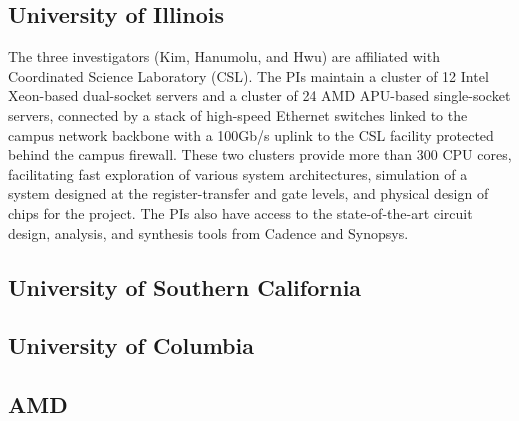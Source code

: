\subsection{University of Illinois}
The three investigators (Kim, Hanumolu, and Hwu) are affiliated with Coordinated Science Laboratory (CSL). 
The PIs maintain a cluster of 12 Intel Xeon-based dual-socket servers and a cluster of 24 AMD APU-based single-socket servers, connected by a stack of high-speed Ethernet switches linked to the campus network backbone with a 100Gb/s uplink to the CSL facility protected behind the campus firewall.
These two clusters provide more than 300 CPU cores, facilitating fast exploration of various system architectures, simulation of a system designed at the register-transfer and gate levels, and physical design of chips for the project.
The PIs also have access to the state-of-the-art circuit design, analysis, and synthesis tools from Cadence and Synopsys.

\subsection{University of Southern California}
\subsection{University of Columbia}

\subsection{AMD}
